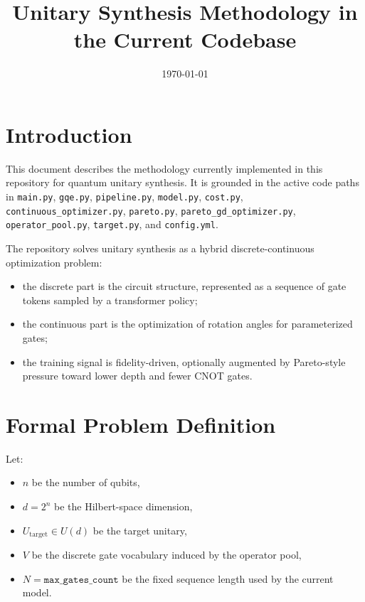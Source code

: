 \documentclass[11pt]{article}
\title{Unitary Synthesis Methodology in the Current Codebase}
\author{}
\date{\today}
\begin{document}
\maketitle
\tableofcontents

\section{Introduction}

This document describes the methodology currently implemented in this repository for quantum unitary synthesis. It is grounded in the active code paths in \texttt{main.py}, \texttt{gqe.py}, \texttt{pipeline.py}, \texttt{model.py}, \texttt{cost.py}, \texttt{continuous\_optimizer.py}, \texttt{pareto.py}, \texttt{pareto\_gd\_optimizer.py}, \texttt{operator\_pool.py}, \texttt{target.py}, and \texttt{config.yml}.

The repository solves unitary synthesis as a hybrid discrete-continuous optimization problem:

\begin{itemize}[leftmargin=*]
\item the discrete part is the circuit structure, represented as a sequence of gate tokens sampled by a transformer policy;
\item the continuous part is the optimization of rotation angles for parameterized gates;
\item the training signal is fidelity-driven, optionally augmented by Pareto-style pressure toward lower depth and fewer CNOT gates.
\end{itemize}

\section{Formal Problem Definition}

Let:

\begin{itemize}[leftmargin=*]
\item $n$ be the number of qubits,
\item $d = 2^n$ be the Hilbert-space dimension,
\item $U_{\mathrm{target}} \in U(d)$ be the target unitary,
\item $V$ be the discrete gate vocabulary induced by the operator pool,
\item $N = \texttt{max\_gates\_count}$ be the fixed sequence length used by the current model.
\end{itemize}
\end{document}
